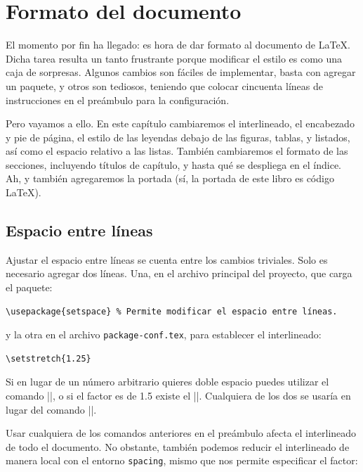 \chapter{Formato del documento}



El momento por fin ha llegado: es hora de dar formato al documento de \LaTeX{}. Dicha tarea resulta un tanto frustrante porque modificar el estilo es como una caja de sorpresas. Algunos cambios son fáciles de implementar, basta con agregar un paquete, y otros son tediosos, teniendo que colocar cincuenta líneas de instrucciones en el preámbulo para la configuración.

Pero vayamos a ello. En este capítulo cambiaremos el interlineado, el encabezado y pie de página, el estilo de las leyendas debajo de las figuras, tablas, y listados, así como el espacio relativo a las listas. También cambiaremos el formato de las secciones, incluyendo títulos de capítulo, y hasta qué se despliega en el índice. Ah, y también agregaremos la portada (sí, la portada de este libro es código \LaTeX{}).



\section{Espacio entre líneas}
\label{sec:espacio_entre_lineas}



Ajustar el espacio entre líneas se cuenta entre los cambios triviales. Solo es necesario agregar dos líneas. Una, en el archivo principal del proyecto, que carga el paquete:

\begin{lstlisting}[style=latex]
\usepackage{setspace} % Permite modificar el espacio entre líneas.
\end{lstlisting}

\noindent y la otra en el archivo \texttt{package-conf.tex}, para establecer el interlineado:

\begin{lstlisting}[style=latex]
\setstretch{1.25}
\end{lstlisting}

Si en lugar de un número arbitrario quieres doble espacio puedes utilizar el comando |\doublespacing|, o si el factor es de 1.5 existe el |\onehalfspacing|. Cualquiera de los dos se usaría en lugar del comando |\setstretch|.

\begin{spacing}{0.85}
Usar cualquiera de los comandos anteriores en el preámbulo afecta el interlineado de todo el documento. No obstante, también podemos reducir el interlineado de manera local con el entorno \texttt{spacing}, mismo que nos permite especificar el factor:
\end{spacing}

